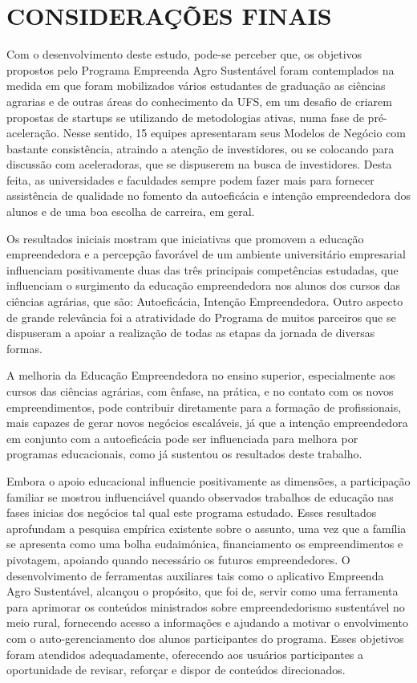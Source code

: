 \chapter{CONSIDERAÇÕES FINAIS}


Com o desenvolvimento deste estudo, pode-se perceber que, os objetivos propostos pelo Programa Empreenda Agro Sustentável foram contemplados na medida em que foram mobilizados vários estudantes de graduação as ciências agrarias e de outras áreas do conhecimento da UFS, em um desafio de criarem propostas de startups se utilizando de metodologias ativas, numa fase de pré-aceleração. Nesse sentido, 15 equipes apresentaram seus Modelos de Negócio com bastante consistência, atraindo a atenção de investidores, ou se colocando para discussão com aceleradoras, que se dispuserem na busca de investidores. Desta feita, as universidades e faculdades sempre podem fazer mais para fornecer assistência de qualidade no fomento da autoeficácia e intenção empreendedora dos alunos e de uma boa escolha de carreira, em geral.

Os resultados iniciais mostram que iniciativas que promovem a educação empreendedora e a percepção favorável de um ambiente universitário empresarial influenciam positivamente duas das três principais competências estudadas, que influenciam o surgimento da educação empreendedora nos alunos dos cursos das ciências agrárias, que são: Autoeficácia, Intenção Empreendedora. Outro aspecto de grande relevância foi a atratividade do Programa de muitos parceiros que se dispuseram a apoiar a realização de todas as etapas da jornada de diversas formas.

A melhoria da Educação Empreendedora no ensino superior, especialmente aos cursos das ciências agrárias, com ênfase, na prática, e no contato com os novos empreendimentos, pode contribuir diretamente para a formação de profissionais, mais capazes de gerar novos negócios escaláveis, já que a intenção empreendedora em conjunto com a autoeficácia pode ser influenciada para melhora por programas educacionais, como já sustentou os resultados deste trabalho.

Embora o apoio educacional influencie positivamente as dimensões, a participação familiar se mostrou influenciável quando observados trabalhos de educação nas fases inicias dos negócios tal qual este programa estudado. Esses resultados aprofundam a pesquisa empírica existente sobre o assunto, uma vez que a família se apresenta como uma bolha eudaimónica, financiamento os empreendimentos e pivotagem, apoiando quando necessário os futuros empreendedores.
O desenvolvimento de ferramentas auxiliares tais como o aplicativo Empreenda Agro Sustentável, alcançou o propósito, que foi de, servir como uma ferramenta para aprimorar os conteúdos ministrados sobre empreendedorismo sustentável no meio rural, fornecendo acesso a informações e ajudando a motivar o envolvimento com o auto-gerenciamento dos alunos participantes do programa. Esses objetivos foram atendidos adequadamente, oferecendo aos usuários participantes a oportunidade de revisar, reforçar e dispor de conteúdos direcionados.

